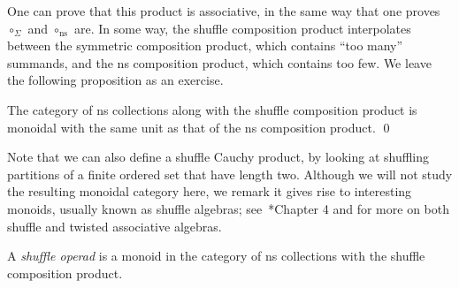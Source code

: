 One can prove that this product is
associative, in the same way that one
proves $\circ_\Sigma$ and $\circ_\mathrm{ns}$
are. In some way, the shuffle composition
product interpolates between the symmetric
composition product, which contains ``too
many'' summands, and the ns composition
product, which contains too few. We
leave the following proposition as an exercise.

\begin{proposition}
The category of ns collections along with
the shuffle composition product is 
monoidal with the same unit as that of the
ns composition product. \qed
\end{proposition}

Note that we can also define a shuffle
Cauchy product, by looking at shuffling
partitions of a finite ordered set that
have length two. Although we will not study
the resulting monoidal category here,
we remark it gives rise to interesting
monoids, usually known as shuffle algebras;
see~\cite{Bremner2016}*{Chapter 4} and
\cite{Mendez2010} for more on both
shuffle and twisted associative algebras.

\begin{definition}
A \emph{shuffle operad} is a monoid in the category of 
ns collections with the shuffle composition 
product. 
\end{definition}

